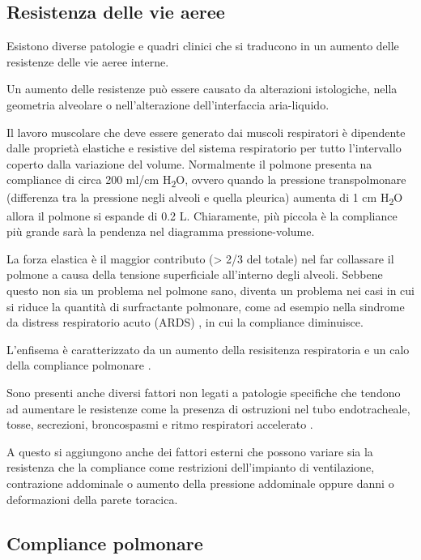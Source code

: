 \subsection{Resistenza delle vie aeree}

Esistono diverse patologie e quadri clinici che si traducono in un aumento delle resistenze delle vie aeree interne. 

Un aumento delle resistenze può essere causato da alterazioni istologiche, nella geometria alveolare o nell'alterazione dell'interfaccia aria-liquido.

Il lavoro muscolare che deve essere generato dai muscoli respiratori è dipendente dalle proprietà elastiche e resistive del sistema respiratorio per tutto l'intervallo coperto dalla variazione del volume. Normalmente il polmone presenta na compliance di circa 200 ml/cm H\textsubscript{2}O, ovvero quando la pressione transpolmonare (differenza tra la pressione negli alveoli e quella pleurica) aumenta di 1 cm H\textsubscript{2}O allora il polmone si espande di 0.2 L. Chiaramente, più piccola è la compliance più grande sarà la pendenza nel diagramma pressione-volume. 

La forza elastica è il maggior contributo (> 2/3 del totale) nel far collassare il polmone a causa della tensione superficiale all'interno degli alveoli. Sebbene questo non sia un problema nel polmone sano, diventa un problema nei casi in cui si riduce la quantità di surfractante polmonare, come ad esempio nella sindrome da distress respiratorio acuto (ARDS) \cite{milic-emili_basics_1999}, in cui la compliance diminuisce. 

L'enfisema è caratterizzato da un aumento della resisitenza respiratoria e un calo della compliance polmonare \cite{milic-emili_basics_1999}.

Sono presenti anche diversi fattori non legati a patologie specifiche che tendono ad aumentare le resistenze come la presenza di ostruzioni nel tubo endotracheale, tosse, secrezioni, broncospasmi e ritmo respiratori accelerato \cite{grossbach_overview_2011}.

A questo si aggiungono anche dei fattori esterni che possono variare sia la resistenza che la compliance come restrizioni dell'impianto di ventilazione, contrazione addominale o aumento della pressione addominale oppure danni o deformazioni della parete toracica.

\subsection{Compliance polmonare}

